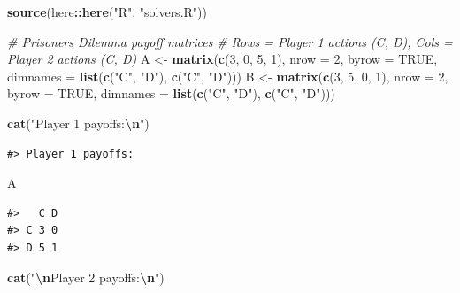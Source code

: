 \documentclass[
]{article}
\newenvironment{Shaded}{\begin{snugshade}}{\end{snugshade}}
\newcommand{\AttributeTok}[1]{\textcolor[rgb]{0.13,0.29,0.53}{#1}}
\newcommand{\CommentTok}[1]{\textcolor[rgb]{0.56,0.35,0.01}{\textit{#1}}}
\newcommand{\ConstantTok}[1]{\textcolor[rgb]{0.56,0.35,0.01}{#1}}
\newcommand{\DecValTok}[1]{\textcolor[rgb]{0.00,0.00,0.81}{#1}}
\newcommand{\FunctionTok}[1]{\textcolor[rgb]{0.13,0.29,0.53}{\textbf{#1}}}
\newcommand{\NormalTok}[1]{#1}
\newcommand{\OtherTok}[1]{\textcolor[rgb]{0.56,0.35,0.01}{#1}}
\newcommand{\SpecialCharTok}[1]{\textcolor[rgb]{0.81,0.36,0.00}{\textbf{#1}}}
\newcommand{\StringTok}[1]{\textcolor[rgb]{0.31,0.60,0.02}{#1}}
\begin{document}
\begin{Shaded}
\begin{Highlighting}[]
\FunctionTok{source}\NormalTok{(here}\SpecialCharTok{::}\FunctionTok{here}\NormalTok{(}\StringTok{"R"}\NormalTok{, }\StringTok{"solvers.R"}\NormalTok{))}

\CommentTok{\# Prisoner\textquotesingle{}s Dilemma payoff matrices}
\CommentTok{\# Rows = Player 1 actions (C, D), Cols = Player 2 actions (C, D)}
\NormalTok{A }\OtherTok{\textless{}{-}} \FunctionTok{matrix}\NormalTok{(}\FunctionTok{c}\NormalTok{(}\DecValTok{3}\NormalTok{, }\DecValTok{0}\NormalTok{, }\DecValTok{5}\NormalTok{, }\DecValTok{1}\NormalTok{), }\AttributeTok{nrow =} \DecValTok{2}\NormalTok{, }\AttributeTok{byrow =} \ConstantTok{TRUE}\NormalTok{,}
            \AttributeTok{dimnames =} \FunctionTok{list}\NormalTok{(}\FunctionTok{c}\NormalTok{(}\StringTok{"C"}\NormalTok{, }\StringTok{"D"}\NormalTok{), }\FunctionTok{c}\NormalTok{(}\StringTok{"C"}\NormalTok{, }\StringTok{"D"}\NormalTok{)))}
\NormalTok{B }\OtherTok{\textless{}{-}} \FunctionTok{matrix}\NormalTok{(}\FunctionTok{c}\NormalTok{(}\DecValTok{3}\NormalTok{, }\DecValTok{5}\NormalTok{, }\DecValTok{0}\NormalTok{, }\DecValTok{1}\NormalTok{), }\AttributeTok{nrow =} \DecValTok{2}\NormalTok{, }\AttributeTok{byrow =} \ConstantTok{TRUE}\NormalTok{,}
            \AttributeTok{dimnames =} \FunctionTok{list}\NormalTok{(}\FunctionTok{c}\NormalTok{(}\StringTok{"C"}\NormalTok{, }\StringTok{"D"}\NormalTok{), }\FunctionTok{c}\NormalTok{(}\StringTok{"C"}\NormalTok{, }\StringTok{"D"}\NormalTok{)))}

\FunctionTok{cat}\NormalTok{(}\StringTok{"Player 1 payoffs:}\SpecialCharTok{\textbackslash{}n}\StringTok{"}\NormalTok{)}
\end{Highlighting}
\end{Shaded}

\begin{verbatim}
#> Player 1 payoffs:
\end{verbatim}

\begin{Shaded}
\begin{Highlighting}[]
\NormalTok{A}
\end{Highlighting}
\end{Shaded}

\begin{verbatim}
#>   C D
#> C 3 0
#> D 5 1
\end{verbatim}

\begin{Shaded}
\begin{Highlighting}[]
\FunctionTok{cat}\NormalTok{(}\StringTok{"}\SpecialCharTok{\textbackslash{}n}\StringTok{Player 2 payoffs:}\SpecialCharTok{\textbackslash{}n}\StringTok{"}\NormalTok{)}
\end{Highlighting}
\end{Shaded}
\end{document}
